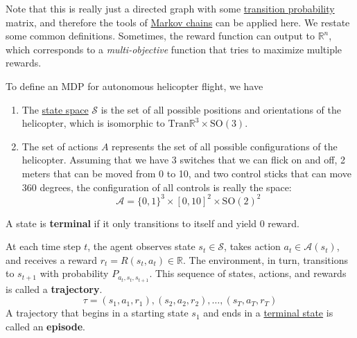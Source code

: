 \documentclass{article}
\begin{document}
  Note that this is really just a directed graph with some \hyperref[sp-def:transition-probability]{transition probability} matrix, and therefore the tools of \hyperref[sp-def:markov-chain]{Markov chains} can be applied here. We restate some common definitions. Sometimes, the reward function can output to $\mathbb{R}^n$, which corresponds to a \textit{multi-objective} function that tries to maximize multiple rewards. 

  \begin{example}
    \label{ex:autonomous-helicopter-flight}
    To define an MDP for autonomous helicopter flight, we have 
    \begin{enumerate}
      \item The \hyperref[def:state-space]{state space} $\mathcal{S}$ is the set of all possible positions and orientations of the helicopter, which is isomorphic to $\mathrm{Tran}\mathbb{R}^3 \times \mathrm{SO}(3)$. 
      \item The set of actions $A$ represents the set of all possible configurations of the helicopter. Assuming that we have 3 switches that we can flick on and off, 2 meters that can be moved from 0 to 10, and two control sticks that can move 360 degrees, the configuration of all controls is really the space: 
        \begin{equation}
          \mathcal{A} = \{0, 1\}^3 \times [0, 10]^2 \times \mathrm{SO}(2)^2
        \end{equation}
    \end{enumerate}
  \end{example}

  \begin{definition}
    \label{def:terminal-state}
    A state is \textbf{terminal} if it only transitions to itself and yield $0$ reward. 
  \end{definition}

  \begin{definition}[Trajectory]
    \label{def:trajectory}
    At each time step $t$, the agent observes state $s_t \in \mathcal{S}$, takes action $a_t \in \mathcal{A}(s_t)$, and receives a reward $r_t = R(s_t, a_t) \in \mathbb{R}$. The environment, in turn, transitions to $s_{t+1}$ with probability $P_{a_t, s_t, s_{t+1}}$. This sequence of states, actions, and rewards is called a \textbf{trajectory}. 
    \begin{equation}
      \tau = (s_1, a_1, r_1), (s_2, a_2, r_2), \ldots, (s_T, a_T, r_T)
    \end{equation}
    A trajectory that begins in a starting state $s_1$ and ends in a \hyperref[def:terminal-state]{terminal state} is called an \textbf{episode}. 
  \end{definition}
\end{document}
